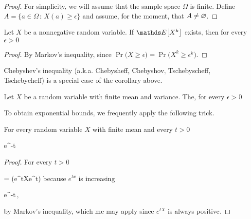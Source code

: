 \documentclass[scombinatorics.tex]{subfiles}
\begin{document}
\begin{proof}
  For simplicity, we will assume that the sample space $\Omega$ is finite. Define $A=\{a\in\Omega\,:\, X(a)\ge\epsilon\}$ and assume, for the moment, that $A\neq\varnothing$.





\end{proof}

\begin{corollary}
  Let $X$ be a nonnegative random variable.
  If $\Ex\big[X^k\big]$ exists, then for every $\epsilon>0$
  
  {\le}
  {}
\end{corollary}

\begin{proof}
  By Markov's inequality, since $\Pr\big(X\ge\epsilon\big)=\Pr\big(X^k\ge\epsilon^k\big)$.
\end{proof}

Chebyshev's inequality (a.k.a. Chebysheff, Chebyshov, Tschebyscheff, Tschebycheff) is a special case of the corollary above.

\begin{void_thm}\label{Chebyshev}
    Let $X$ be a random variable with finite mean and variance.
    The, for every $\epsilon>0$
    
    {\le}
    {}\QED
\end{void_thm}

To obtain exponential bounds, we frequently apply the following trick.

\begin{void_thm}\label{lem_chernoff_method}
  For every random variable $X$ with finite mean and every $t>0$

  {\le}
  {e^{-t\epsilon}\,\Ex\big[e^{tX}\big]}
\end{void_thm}

\begin{proof}
  For  every $t>0$

  {=}
  {\Pr\big(e^{tX}\ge e^{t\epsilon}\big)}
  \hfill because $e^{tx}$ is increasing
  
  \ceq{}
  {\le}
  {e^{-t\epsilon}\,\Ex\big[e^{tX}\big],}

  by Markov's inequality, which me may apply since $e^{tX}$ is always positive. 
\end{proof}
\end{document}
